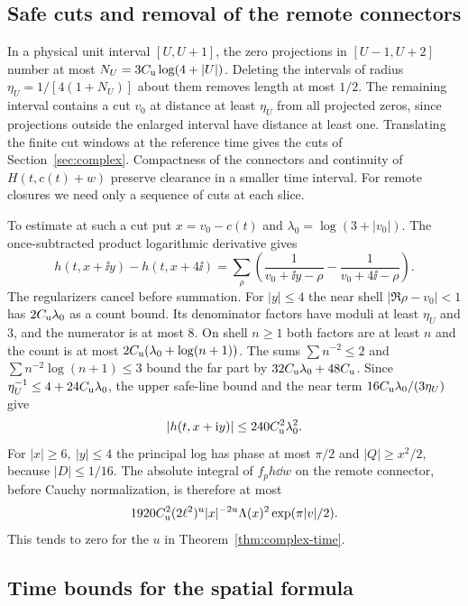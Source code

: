 \subsection{Safe cuts and removal of the remote connectors}\label{app:clearance}

In a physical unit interval \([U,U+1]\), the zero projections
in \([U-1,U+2]\) number at most \(N_U=3C_{\mathrm u}\log(4+|U|)\).
Deleting the intervals of radius
\(\eta_U=1/[4(1+N_U)]\) about them removes length at most \(1/2\).
The remaining interval contains a cut \(v_0\) at distance at
least \(\eta_U\) from all projected zeros, since projections
outside the enlarged interval have distance at least one.
Translating the finite cut windows at the reference time gives
the cuts of Section~\ref{sec:complex}. Compactness of the
connectors and continuity of \(H(t,c(t)+w)\) preserve clearance
in a smaller time interval. For remote closures we need only
a sequence of cuts at each slice.

To estimate at such a cut put \(x=v_0-c(t)\) and
\(\lambda_0=\log(3+|v_0|)\). The once-subtracted product
logarithmic derivative gives
\[
 h(t,x+\ii y)-h(t,x+4\ii)
  =\sum_\rho\left(\frac1{v_0+\ii y-\rho}-\frac1{v_0+4\ii-\rho}\right).
\]
The regularizers cancel before summation. For \(|y|\le4\)
the near shell \(|\Re\rho-v_0|<1\) has
\(2C_{\mathrm u}\lambda_0\) as a count bound. Its denominator factors
have moduli at least \(\eta_U\) and \(3\), and the numerator is
at most \(8\). On shell \(n\ge1\) both factors are at least \(n\)
and the count is at most \(2C_{\mathrm u}(\lambda_0+\log(n+1))\).
The sums \(\sum n^{-2}\le2\) and
\(\sum n^{-2}\log(n+1)\le3\) bound the far part by
\(32C_{\mathrm u}\lambda_0+48C_{\mathrm u}\). Since
\(\eta_U^{-1}\le4+24C_{\mathrm u}\lambda_0\), the upper safe-line
bound and the near term \(16C_{\mathrm u}\lambda_0/(3\eta_U)\) give
\[
 |h(t,x+\mathrm i y)|\le240C_{\mathrm u}^2\lambda_0^2 .
\]
For \(|x|\ge6,\ |y|\le4\) the principal log has phase at most
\(\pi/2\) and \(|Q|\ge x^2/2\), because \(|D|\le1/16\).
The absolute integral of \(f_ph\dd w\) on the remote connector,
before Cauchy normalization, is therefore at most
\begin{equation}
 1920 C_{\mathrm u}^2(2\ell^2)^u |x|^{-2u}
                      \Lambda(x)^2\exp(\pi|v|/2).
 \label{app:edge-bound}
\end{equation}
This tends to zero for the \(u\) in Theorem~\ref{thm:complex-time}.

\subsection{Time bounds for the spatial formula}\label{app:time-bounds}

